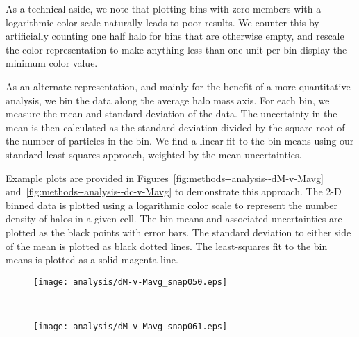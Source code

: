 As a technical aside, we note that plotting bins with zero members with a logarithmic color scale naturally leads to poor results.  We counter this by artificially counting one half halo for bins that are otherwise empty, and rescale the color representation to make anything less than one unit per bin display the minimum color value.

As an alternate representation, and mainly for the benefit of a more quantitative analysis, we bin the data along the average halo mass axis.  For each bin, we measure the mean and standard deviation of the data.  The uncertainty in the mean is then calculated as the standard deviation divided by the square root of the number of particles in the bin.  We find a linear fit to the bin means using our standard least-squares approach, weighted by the mean uncertainties.

Example plots are provided in Figures~\ref{fig:methods--analysis--dM-v-Mavg} and~\ref{fig:methods--analysis--dc-v-Mavg} to demonstrate this approach.  The 2-D binned data is plotted using a logarithmic color scale to represent the number density of halos in a given cell.  The bin means and associated uncertainties are plotted as the black points with error bars.  The standard deviation to either side of the mean is plotted as black dotted lines.  The least-squares fit to the bin means is plotted as a solid magenta line.

\begin{figure*}[t]
	\centering
	\begin{subfigure}{}
		\texttt{[image: analysis/dM-v-Mavg\_snap050.eps]}
	\end{subfigure}
	\\
	\begin{subfigure}{}
		\texttt{[image: analysis/dM-v-Mavg\_snap061.eps]}
	\end{subfigure}
	\caption[$\Delta M_{\mathrm{vir}}$ as a function of $M_{\mathrm{vir,avg}}$]{\footnotesize $\Delta M_{\mathrm{vir}}$ as a function of $M_{\mathrm{vir,avg}}$.  For the 2-D color histogram, halos are counted in rectangular bins and smoothed with a Gaussian kernel with a logarithmic color scale.  The halos are also divided into logarithmically-spaced bins in average virial mass, and the mean for each bin is plotted as a black point.  The black dotted curves are the standard deviation around the mean.  The magenta line is the linear least-squares best fit to the bin means.  The light grey dashed line at $\Delta q = 0$ is provided to guide the eye.  The two panels correspond to snapshots at $z = 10.3$ and $z = 6.0$.  These plots are provided as examples of the output at this stage of the analysis and are further discussed in Chapter~\ref{chap:2lpt}.}
	\label{fig:methods--analysis--dM-v-Mavg}
\end{figure*}

